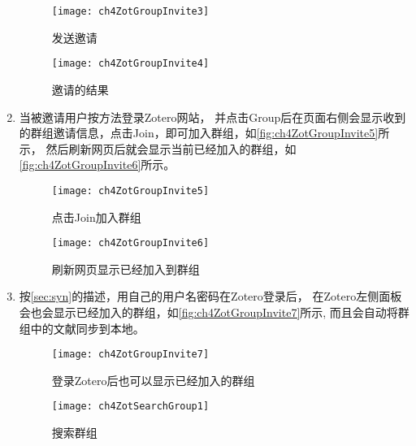 \documentclass[cn,11pt,chinese]{elegantbook}
\begin{document}
\begin{enumerate}
\begin{figure}[t]
		\begin{minipage}[b]{\dimexpr.5\textwidth-1em}
			\centering
			\texttt{[image: ch4ZotGroupInvite3]}
			\caption{发送邀请}
			\label{fig:ch4ZotGroupInvite3}
		\end{minipage}
		\begin{minipage}[b]{\dimexpr.5\textwidth-1em}
			\centering
			\texttt{[image: ch4ZotGroupInvite4]}
			\caption{邀请的结果}
			\label{fig:ch4ZotGroupInvite4}
		\end{minipage}
	\end{figure}
	\item 当被邀请用户按方法登录Zotero网站，
	并点击Group后在页面右侧会显示收到的群组邀请信息，点击Join，即可加入群组，如\autoref{fig:ch4ZotGroupInvite5}所示，
	然后刷新网页后就会显示当前已经加入的群组，如\autoref{fig:ch4ZotGroupInvite6}所示。
	\begin{figure}[t]
		\begin{minipage}[b]{\dimexpr.5\textwidth-1em}
			\centering
			\texttt{[image: ch4ZotGroupInvite5]}
			\caption{点击Join加入群组}
			\label{fig:ch4ZotGroupInvite5}
		\end{minipage}
		\begin{minipage}[b]{\dimexpr.5\textwidth-1em}
			\centering
			\texttt{[image: ch4ZotGroupInvite6]}
			\caption{刷新网页显示已经加入到群组}
			\label{fig:ch4ZotGroupInvite6}
		\end{minipage}
	\end{figure}
	\item 按\cref{sec:syn}的描述，用自己的用户名密码在Zotero登录后，
	在Zotero左侧面板会也会显示已经加入的群组，如\autoref{fig:ch4ZotGroupInvite7}所示,
	而且会自动将群组中的文献同步到本地。
	\begin{figure}[t]
			\begin{minipage}[b]{\dimexpr.5\textwidth-1em}
				\centering
				\texttt{[image: ch4ZotGroupInvite7]}
				\caption{登录Zotero后也可以显示已经加入的群组}
				\label{fig:ch4ZotGroupInvite7}
			\end{minipage}
			\begin{minipage}[b]{\dimexpr.5\textwidth-1em}
				\centering
				\texttt{[image: ch4ZotSearchGroup1]}
				\caption{搜索群组}
				\label{fig:ch4ZotSearchGroup1}
			\end{minipage}
	\end{figure}
	
\end{enumerate}
\end{document}
